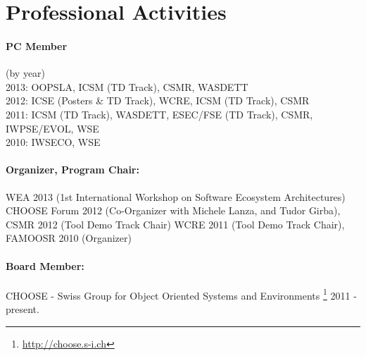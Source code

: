 \documentclass[a4paper]{article}
\newcommand{\longcv}[1]{#1}
\newcommand{\shortcv}[1]{}
\newcommand{\longcv}[1]{}
\newcommand{\shortcv}[1]{#1}
\begin{document}
\longcv{\section{Professional Activities}}
\shortcv{\section{Selected Professional Activities}}

\shortcv{
\paragraph{Journal Reviewer:}
Journal of Software Maintenance and Evolution, %
Empirical Software Engineering, %
Elsevier Journal of Systems and Software,
Elsevier Science of Computer Programming, %
Foundations and Trends in Human Computer Interaction %
}

\longcv{
}

\paragraph{PC Member} 
(by year) \\
2013: OOPSLA, ICSM (TD Track), CSMR, WASDETT \\
2012: ICSE (Posters \& TD Track), WCRE, ICSM (TD Track), CSMR \\
2011: ICSM (TD Track), WASDETT, ESEC/FSE (TD Track), CSMR, IWPSE/EVOL, WSE  \\
2010: IWSECO, WSE

\paragraph{Organizer, Program Chair:}
WEA 2013 (1st International Workshop on Software Ecosystem Architectures)
CHOOSE Forum 2012 (Co-Organizer with Michele Lanza, and Tudor Girba),
CSMR 2012 (Tool Demo Track Chair)
WCRE 2011 (Tool Demo Track Chair), 
FAMOOSR 2010 (Organizer)

\paragraph{Board Member:}
CHOOSE - Swiss Group for Object Oriented Systems and Environments \footnote{\url{http://choose.s-i.ch}} 2011 - present.
\end{document}
